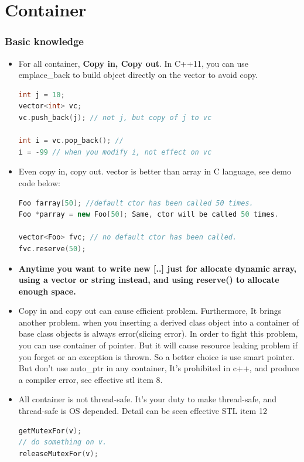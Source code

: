 \documentclass[a4paper,12pt,twoside]{book}
\begin{document}
\section{Container}

\subsubsection{Basic knowledge}
\begin{itemize}

\item For all container, \textbf{Copy in, Copy out}. In C++11, you can use emplace\_back to build object directly on the vector to avoid copy.
\begin{lstlisting}[frame=single, language=c++]
int j = 10;
vector<int> vc;
vc.push_back(j); // not j, but copy of j to vc

int i = vc.pop_back(); //
i = -99 // when you modify i, not effect on vc
\end{lstlisting}

\item Even copy in, copy out. vector is better than array in C language, see demo code below:
\begin{lstlisting}[frame=single, language=c++]
Foo farray[50]; //default ctor has been called 50 times.
Foo *parray = new Foo[50]; Same, ctor will be called 50 times.

vector<Foo> fvc; // no default ctor has been called.
fvc.reserve(50);
\end{lstlisting}

\item \textbf{Anytime you want to write new [..] just for allocate dynamic array, using a vector or string instead, and using reserve() to allocate enough space.}


\item Copy in and copy out can cause efficient problem. Furthermore, It brings  another problem. when you inserting a derived class object into a container of base class objects is always error(slicing error). In order to fight this problem, you can use container of pointer. But it will cause resource leaking problem if you forget or an exception is thrown. So a better choice is use smart pointer. But don't use auto\_ptr in any container, It's prohibited in c++, and produce a compiler error, see effective stl item 8.

\item All container is not thread-safe. It's your duty to make thread-safe, and thread-safe is OS depended. Detail can be seen effective STL item 12
\begin{lstlisting}[frame=single, language=c++]
getMutexFor(v);
// do something on v.
releaseMutexFor(v);
\end{lstlisting}


\end{itemize}
\end{document}
